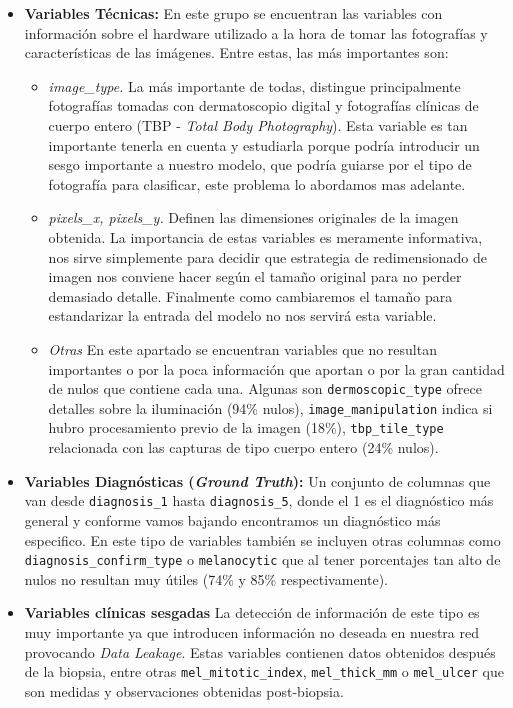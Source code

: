 \begin{itemize}
	
	\item \textbf{Variables Técnicas:} En este grupo se encuentran las variables con información sobre el hardware utilizado a la hora de tomar las fotografías y características de las imágenes. Entre estas, las más importantes son:
	\begin{itemize}
		\item \textit{image\_type.} La más importante de todas, distingue principalmente fotografías tomadas con dermatoscopio digital y fotografías clínicas de cuerpo entero (TBP - \textit{Total Body Photography}). Esta variable es tan importante tenerla en cuenta y estudiarla porque podría introducir un sesgo importante a nuestro modelo, que podría guiarse por el tipo de fotografía para clasificar, este problema lo abordamos mas adelante.
		\item \textit{pixels\_x, pixels\_y.} Definen las dimensiones originales de la imagen obtenida. La importancia de estas variables es meramente informativa, nos sirve simplemente para decidir que estrategia de redimensionado de imagen nos conviene hacer según el tamaño original para no perder demasiado detalle. Finalmente como cambiaremos el tamaño para estandarizar la entrada del modelo no nos servirá esta variable.
		\item \textit{Otras} En este apartado se encuentran variables que no resultan importantes o por la poca información que aportan o por la gran cantidad de nulos que contiene cada una. Algunas son \texttt{dermoscopic\_type} ofrece detalles sobre la iluminación (94\% nulos), \texttt{image\_manipulation} indica si hubro procesamiento previo de la imagen (18\%), \texttt{tbp\_tile\_type} relacionada con las capturas de tipo cuerpo entero (24\% nulos).
		
	\end{itemize}
 
	\item \textbf{Variables Diagnósticas (\textit{Ground Truth}):} Un conjunto de columnas que van desde \texttt{diagnosis\_1} hasta \texttt{diagnosis\_5}, donde el 1 es el diagnóstico más general y conforme vamos bajando encontramos un diagnóstico más especifico. En este tipo de variables también se incluyen otras columnas como \texttt{diagnosis\_confirm\_type} o \texttt{melanocytic} que al tener porcentajes tan alto de nulos no resultan muy útiles (74\% y 85\% respectivamente).

	\item \textbf{Variables clínicas sesgadas} La detección de información de este tipo es muy importante ya que introducen información no deseada en nuestra red provocando \textit{Data Leakage}. Estas variables contienen datos obtenidos después de la biopsia, entre otras \texttt{mel\_mitotic\_index}, \texttt{mel\_thick\_mm} o \texttt{mel\_ulcer} que son medidas y observaciones obtenidas post-biopsia.
	
\end{itemize}



